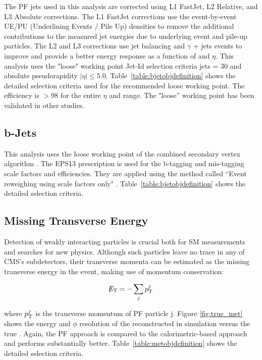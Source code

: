 The PF jets used in this analysis are corrected using L1 FastJet, L2 Relative, and L3 Absolute corrections. The L1 FastJet corrections use the event-by-event UE/PU (Underlining Events / Pile Up) densities to remove the additional contributions to the measured jet energies due to underlying event and pile-up particles. The L2 and L3 corrections use jet balancing and \ensuremath{\gamma} + jets events to improve and provide a better energy response as a function of \pt and \ensuremath{\eta}. This analysis uses the "loose" working point Jet-Id selection criteria jets \pt = 30 \gev and absolute pseudorapidity $|\eta| \le 5.0$. Table~\ref{table:bjetobjdefinition} shows the detailed selection criteria used for the recommended loose working point. The efficiency is $> 98$ for the entire $\eta$ and \pt range. The "loose'' working point has been validated in other studies.

\subsection{b-Jets} 
\label{subsec::objsel_bjet}
This analysis uses the loose working point of the combined secondary vertex algorithm \cite{CMS:2011cra}. The EPS13 prescription is used for the b-tagging and mis-tagging scale factors and efficiencies. They are applied using the method called ``Event reweighing using scale factors only" \cite{Ferencek:btag2015}. Table~\ref{table:bjetobjdefinition} shows the detailed selection criteria.

\subsection{Missing Transverse Energy}
\label{subsec::objsel_met}

Detection of weakly interacting particles is crucial both for SM measurements and searches for new physics. Although such particles leave no trace in any of CMS’s subdetectors, their transverse momenta can be estimated as the missing transverse energy in the event, making use of momentum conservation:

\begin{equation}
\slash\mkern-12mu{E}_{\text{T}} =  - \sum_{j} p_{\text{T}}^{j}
\end{equation}
 
where \ensuremath{\pt^{j}} is the transverse momentum of PF particle j. Figure \ref{fig:true_met} shows the energy and \ensuremath{\phi} resolution of the reconstructed \met in simulation versus the true \met. Again, the PF approach is compared to the calorimetric-based approach and performs substantially better. Table~\ref{table:metobjdefinition} shows the detailed selection criteria.

